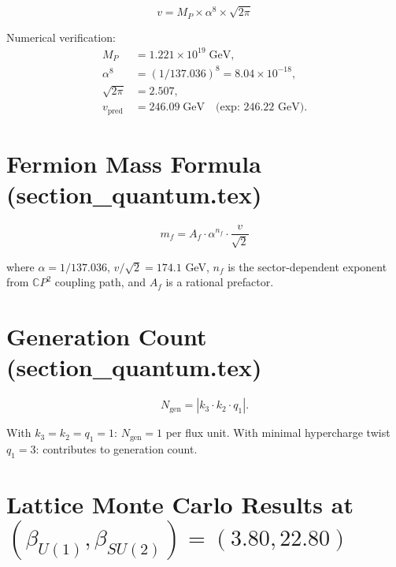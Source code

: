 \documentclass[11pt]{article}
\begin{document}
\begin{equation}\tag{EH-1}
\boxed{v = M_P \times \alpha^8 \times \sqrt{2\pi}}
\end{equation}

Numerical verification:
\begin{align}
M_P &= 1.221 \times 10^{19}\;\text{GeV}, \tag{EH-2} \\
\alpha^8 &= (1/137.036)^8 = 8.04 \times 10^{-18}, \tag{EH-3} \\
\sqrt{2\pi} &= 2.507, \tag{EH-4} \\
v_{\mathrm{pred}} &= 246.09\;\text{GeV} \quad\text{(exp: 246.22 GeV)}. \tag{EH-5}
\end{align}

\section{Fermion Mass Formula (section\_quantum.tex)}

\begin{equation}\tag{FM-1}
\boxed{m_f = A_f \cdot \alpha^{n_f} \cdot \frac{v}{\sqrt{2}}}
\end{equation}

where $\alpha = 1/137.036$, $v/\sqrt{2} = 174.1$ GeV, $n_f$ is the sector-dependent
exponent from $\mathbb{C}P^2$ coupling path, and $A_f$ is a rational prefactor.

\section{Generation Count (section\_quantum.tex)}

\begin{equation}\tag{GEN-1}
N_{\mathrm{gen}} = |k_3 \cdot k_2 \cdot q_1|.
\end{equation}

With $k_3 = k_2 = q_1 = 1$: $N_{\mathrm{gen}} = 1$ per flux unit.
With minimal hypercharge twist $q_1 = 3$: contributes to generation count.

\section{Lattice Monte Carlo Results at $(\beta_{U(1)}, \beta_{SU(2)}) = (3.80, 22.80)$}
\end{document}
